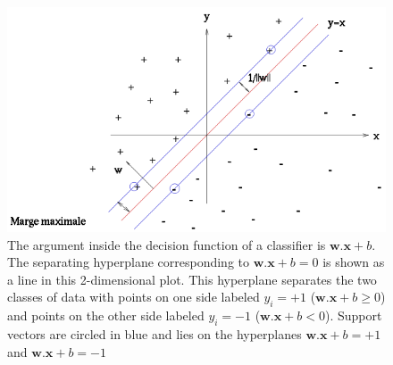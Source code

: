 \begin{figure}
\centering
\includegraphics[width=0.7\linewidth]{images/Separatrice_lineaire_avec_marges}
\caption{The argument inside the decision function of a classifier is $\textbf{w}.\textbf{x} + b$. The separating hyperplane corresponding to $\textbf{w}.\textbf{x} + b = 0$ is shown as a line in this 2-dimensional plot. This hyperplane separates the two classes of data with points on one side labeled $y_i = +1$ ($\textbf{w}.\textbf{x} + b \geq 0$) and points on the other side labeled $y_i=-1$ ($\textbf{w}.\textbf{x} + b < 0$). Support vectors are circled in blue and lies on the hyperplanes $\textbf{w}.\textbf{x} + b = +1$ and $\textbf{w}.\textbf{x} + b = -1$}
\label{fig:Separatrice_lineaire_avec_marges}
\end{figure}




